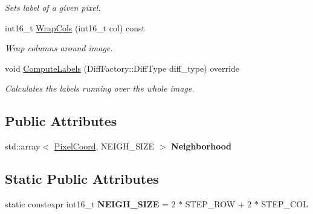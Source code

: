 \begin{DoxyCompactItemize}
\begin{DoxyCompactList}\small\item\em Sets label of a given pixel. \end{DoxyCompactList}\item 
\mbox{\label{classdepth__clustering_1_1LinearImageLabeler_a0dcf6253650499df0c723caaefc459c5}} 
int16\+\_\+t \hyperlink{classdepth__clustering_1_1LinearImageLabeler_a0dcf6253650499df0c723caaefc459c5}{Wrap\+Cols} (int16\+\_\+t col) const
\begin{DoxyCompactList}\small\item\em Wrap columns around image. \end{DoxyCompactList}\item 
\mbox{\label{classdepth__clustering_1_1LinearImageLabeler_a987cca7d9daab304af4bcc448bf6de0f}} 
void \hyperlink{classdepth__clustering_1_1LinearImageLabeler_a987cca7d9daab304af4bcc448bf6de0f}{Compute\+Labels} (Diff\+Factory\+::\+Diff\+Type diff\+\_\+type) override
\begin{DoxyCompactList}\small\item\em Calculates the labels running over the whole image. \end{DoxyCompactList}\end{DoxyCompactItemize}
\subsection*{Public Attributes}
\begin{DoxyCompactItemize}
\item 
\mbox{\label{classdepth__clustering_1_1LinearImageLabeler_a7237797a8c13b16aa3cdefe913d8c938}} 
std\+::array$<$ \hyperlink{structdepth__clustering_1_1PixelCoord}{Pixel\+Coord}, N\+E\+I\+G\+H\+\_\+\+S\+I\+ZE $>$ {\bfseries Neighborhood}
\end{DoxyCompactItemize}
\subsection*{Static Public Attributes}
\begin{DoxyCompactItemize}
\item 
\mbox{\label{classdepth__clustering_1_1LinearImageLabeler_ad6a78dde18091847582a7cea428ed5fb}} 
static constexpr int16\+\_\+t {\bfseries N\+E\+I\+G\+H\+\_\+\+S\+I\+ZE} = 2 $\ast$ S\+T\+E\+P\+\_\+\+R\+OW + 2 $\ast$ S\+T\+E\+P\+\_\+\+C\+OL
\end{DoxyCompactItemize}
